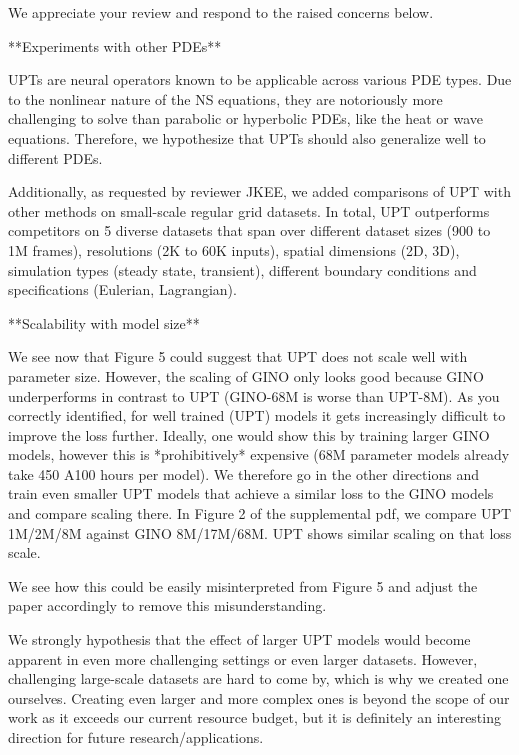 We appreciate your review and respond to the raised concerns below.

**Experiments with other PDEs**

UPTs are neural operators known to be applicable across various PDE types. Due to the nonlinear nature of the NS equations, they are notoriously more challenging to solve than parabolic or hyperbolic PDEs, like the heat or wave equations. Therefore, we hypothesize that UPTs should also generalize well to different PDEs.


Additionally, as requested by reviewer JKEE, we added comparisons of UPT with other methods on small-scale regular grid datasets. In total, UPT outperforms competitors on 5 diverse datasets that span over different dataset sizes (900 to 1M frames), resolutions (2K to 60K inputs), spatial dimensions (2D, 3D), simulation types (steady state, transient), different boundary conditions and specifications (Eulerian, Lagrangian).



**Scalability with model size**


We see now that Figure 5 could suggest that UPT does not scale well with parameter size. However, the scaling of GINO only looks good because GINO underperforms in contrast to UPT (GINO-68M is worse than UPT-8M). As you correctly identified, for well trained (UPT) models it gets increasingly difficult to improve the loss further. Ideally, one would show this by training larger GINO models, however this is *prohibitively* expensive (68M parameter models already take 450 A100 hours per model). We therefore go in the other directions and train even smaller UPT models that achieve a similar loss to the GINO models and compare scaling there. In Figure 2 of the supplemental pdf, we compare UPT 1M/2M/8M against GINO 8M/17M/68M. UPT shows similar scaling on that loss scale.

We see how this could be easily misinterpreted from Figure 5 and adjust the paper accordingly to remove this misunderstanding.

We strongly hypothesis that the effect of larger UPT models would become apparent in even more challenging settings or even
larger datasets. However, challenging large-scale datasets are hard to come by, which is why we created one ourselves. Creating even larger and more complex ones is beyond the scope of our work as it exceeds our current resource budget, but it is definitely an interesting direction for future research/applications.














